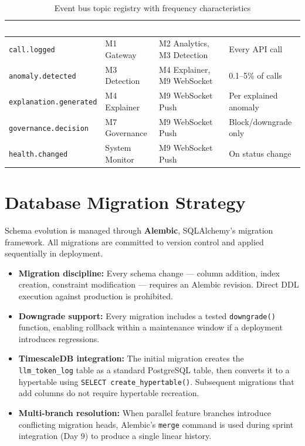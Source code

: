 \documentclass[12pt,a4paper,twoside]{report}
\begin{document}
\begin{table}[H]
\centering
\begin{tabularx}{\textwidth}{|l|l|X|l|}
\hline
\rowcolor{tabheader}
\textcolor{white}{\textbf{Event}} &
\textcolor{white}{\textbf{Publisher}} &
\textcolor{white}{\textbf{Subscribers}} &
\textcolor{white}{\textbf{Frequency}} \\
\hline
\texttt{call.logged} & M1 Gateway & M2 Analytics, M3 Detection & Every API call \\
\hline
\texttt{anomaly.detected} & M3 Detection & M4 Explainer, M9 WebSocket & 0.1--5\% of calls \\
\hline
\texttt{explanation.generated} & M4 Explainer & M9 WebSocket Push & Per explained anomaly \\
\hline
\texttt{governance.decision} & M7 Governance & M9 WebSocket Push & Block/downgrade only \\
\hline
\texttt{health.changed} & System Monitor & M9 WebSocket Push & On status change \\
\hline
\end{tabularx}
\caption{Event bus topic registry with frequency characteristics}
\label{tab:events}
\end{table}

\section{Database Migration Strategy}

Schema evolution is managed through \textbf{Alembic}, SQLAlchemy's migration framework. All migrations are committed to version control and applied sequentially in deployment.

\begin{itemize}
  \item \textbf{Migration discipline:} Every schema change — column addition, index creation, constraint modification — requires an Alembic revision. Direct DDL execution against production is prohibited.

  \item \textbf{Downgrade support:} Every migration includes a tested \texttt{downgrade()} function, enabling rollback within a maintenance window if a deployment introduces regressions.

  \item \textbf{TimescaleDB integration:} The initial migration creates the \texttt{llm\_token\_log} table as a standard PostgreSQL table, then converts it to a hypertable using \texttt{SELECT create\_hypertable()}. Subsequent migrations that add columns do not require hypertable recreation.

  \item \textbf{Multi-branch resolution:} When parallel feature branches introduce conflicting migration heads, Alembic's \texttt{merge} command is used during sprint integration (Day 9) to produce a single linear history.
\end{itemize}
\end{document}
